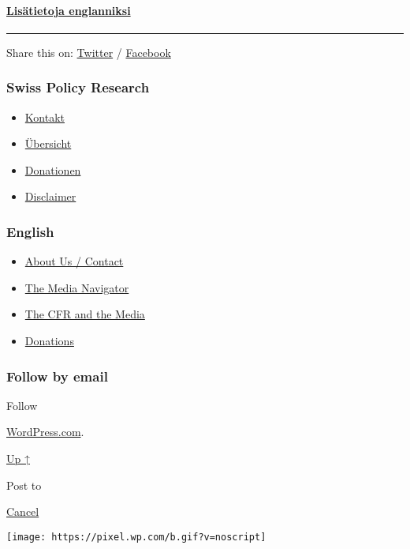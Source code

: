 \hypertarget{lisuxe4tietoja-englanniksi}{%
\paragraph{\texorpdfstring{\href{https://swprs.org/a-swiss-doctor-on-covid-19/}{Lisätietoja
englanniksi}}{Lisätietoja englanniksi}}\label{lisuxe4tietoja-englanniksi}}

\begin{center}\rule{0.5\linewidth}{\linethickness}\end{center}

Share this on:
\href{https://twitter.com/intent/tweet?url=https://swprs.org/faktoja-covid-19sta/}{Twitter}
/
\href{https://www.facebook.com/share.php?u=https://swprs.org/faktoja-covid-19sta/}{Facebook}

\hypertarget{swiss-policy-research}{%
\subsubsection{Swiss Policy Research}\label{swiss-policy-research}}

\begin{itemize}
\tightlist
\item
  \href{https://swprs.org/kontakt/}{Kontakt}
\item
  \href{https://swprs.org/uebersicht/}{Übersicht}
\item
  \href{https://swprs.org/donationen/}{Donationen}
\item
  \href{https://swprs.org/disclaimer/}{Disclaimer}
\end{itemize}

\hypertarget{english}{%
\subsubsection{English}\label{english}}

\begin{itemize}
\tightlist
\item
  \href{https://swprs.org/contact/}{About Us / Contact}
\item
  \href{https://swprs.org/media-navigator/}{The Media Navigator}
\item
  \href{https://swprs.org/the-american-empire-and-its-media/}{The CFR
  and the Media}
\item
  \href{https://swprs.org/donations/}{Donations}
\end{itemize}

\hypertarget{follow-by-email}{%
\subsubsection{Follow by email}\label{follow-by-email}}

Follow

\href{https://wordpress.com/?ref=footer_custom_com}{WordPress.com}.

\protect\hyperlink{}{Up ↑}

Post to

\protect\hyperlink{}{Cancel}

\texttt{[image: https://pixel.wp.com/b.gif?v=noscript]}
